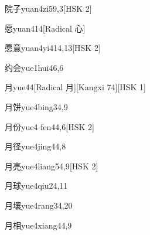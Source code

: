 \begin{entry}{院子}{yuan4zi5}{9,3}[HSK 2]
\end{entry}

\begin{entry}{愿}{yuan4}{14}[Radical 心]
\end{entry}

\begin{entry}{愿意}{yuan4yi4}{14,13}[HSK 2]
\end{entry}

\begin{entry}{约会}{yue1hui4}{6,6}
\end{entry}

\begin{entry}{月}{yue4}{4}[Radical 月][Kangxi 74][HSK 1]
\end{entry}

\begin{entry}{月饼}{yue4bing3}{4,9}
\end{entry}

\begin{entry}{月份}{yue4 fen4}{4,6}[HSK 2]
\end{entry}

\begin{entry}{月径}{yue4jing4}{4,8}
\end{entry}

\begin{entry}{月亮}{yue4liang5}{4,9}[HSK 2]
\end{entry}

\begin{entry}{月球}{yue4qiu2}{4,11}
\end{entry}

\begin{entry}{月壤}{yue4rang3}{4,20}
\end{entry}

\begin{entry}{月相}{yue4xiang4}{4,9}
\end{entry}

